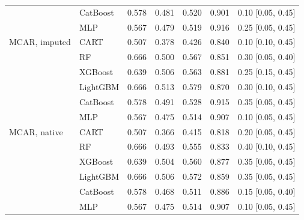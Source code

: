 \documentclass[pdflatex,sn-mathphys]{sn-jnl}
\theoremstyle{thmstyleone}
\begin{document}
\begin{table}[htbp]
\begin{tabular}{@{}llrrrrl@{}}
 & CatBoost & 0.578 & 0.481 & 0.520 & 0.901 & 0.10 [0.05, 0.45] \\
 & MLP & 0.567 & 0.479 & 0.519 & 0.916 & 0.25 [0.05, 0.45] \\
\midrule
MCAR, imputed & CART & 0.507 & 0.378 & 0.426 & 0.840 & 0.10 [0.10, 0.45] \\
 & RF & 0.666 & 0.500 & 0.567 & 0.851 & 0.30 [0.05, 0.40] \\
 & XGBoost & 0.639 & 0.506 & 0.563 & 0.881 & 0.25 [0.15, 0.45] \\
 & LightGBM & 0.666 & 0.513 & 0.579 & 0.870 & 0.30 [0.10, 0.45] \\
 & CatBoost & 0.578 & 0.491 & 0.528 & 0.915 & 0.35 [0.05, 0.45] \\
 & MLP & 0.567 & 0.475 & 0.514 & 0.907 & 0.10 [0.05, 0.45] \\
\midrule
MCAR, native & CART & 0.507 & 0.366 & 0.415 & 0.818 & 0.20 [0.05, 0.45] \\
 & RF & 0.666 & 0.493 & 0.555 & 0.833 & 0.40 [0.10, 0.45] \\
 & XGBoost & 0.639 & 0.504 & 0.560 & 0.877 & 0.35 [0.05, 0.45] \\
 & LightGBM & 0.666 & 0.506 & 0.572 & 0.859 & 0.35 [0.05, 0.45] \\
 & CatBoost & 0.578 & 0.468 & 0.511 & 0.886 & 0.15 [0.05, 0.40] \\
 & MLP & 0.567 & 0.475 & 0.514 & 0.907 & 0.10 [0.05, 0.45] \\
\bottomrule
\end{tabular}
\end{table}
\end{document}
